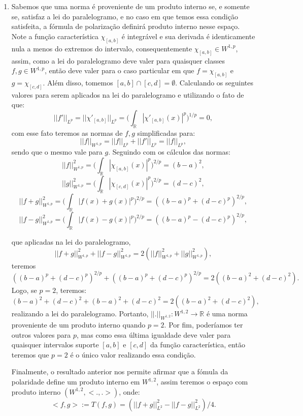 \documentclass{article}
\begin{document}
\begin{enumerate}
\begin{enumerate}
				\item Sabemos que uma norma é proveniente de um produto interno se, e somente se, satisfaz a lei do paralelogramo, e no caso em que temos essa condição satisfeita, a fórmula de polarização definirá produto interno nesse espaço. Note a função característica $\chi_{[a,b]}$ é integrável e sua derivada é identicamente nula a menos do extremos do intervalo, consequentemente $\chi_{[a,b]} \in W^{1,p}$, assim, como a lei do paralelogramo deve valer para quaisquer classes $f, g \in W^{1,p}$, então deve valer para o caso particular em que $f = \chi_{[a,b]}$ e $g = \chi_{[c,d]}$. Além disso, tomemos $[a,b] \cap [c,d] = \emptyset$. Calculando os seguintes valores para serem aplicados na lei do paralelogramo e utilizando o fato de que:
				$$
				||f'||_{ L^{p}}=||\chi'_{[a,b]}||_{L^{p}} = \Big( \int_{\mathbb{R}} |\chi'_{[a,b]}(x)|^{p} \Big)^{1/p} = 0,
				$$
				com esse fato teremos as normas de $f, g$ simplificadas para:
				$$
				||f||_{ W^{1,p}} = ||f||_{L^{p}}+||f'||_{L^{p}} = ||f||_{L^{p}},
				$$
				sendo que o mesmo vale para $g$. Seguindo com os cálculos das normas:
				$$
				||f||_{ W^{1,p}}^{2} = \Big( \int_{\mathbb{R}} |\chi_{[a,b]}(x)|^{p} \Big)^{2/p} = (b-a)^{2},
				$$
				$$  
				||g||_{ W^{1,p}}^{2} = \Big( \int_{\mathbb{R}} |\chi_{[c,d]}(x)|^{p} \Big)^{2/p} = (d-c)^{2},
				$$
				$$
				||f+g||_{ W^{1,p}}^{2} = \Big (\int_{\mathbb{R}}|f(x)+g(x)|^{p} \Big)^{2/p} =((b-a)^{p}+(d-c)^{p})^{2/p},
				$$
				$$
				||f-g||_{ W^{1,p}}^{2} = \Big (\int_{\mathbb{R}}|f(x)-g(x)|^{p} \Big)^{2/p} =((b-a)^{p}-(d-c)^{p})^{2/p},
				$$
				
				que aplicadas na lei do paralelogramo, 
				$$
				||f +g||_{W^{1,p}}^{2}+||f -g||_{W^{1,p}}^{2} =2(||f||_{W^{1,p}}^{2}+||g||_{W^{1,p}}^{2}),
				$$
				teremos
				$$
				((b-a)^{p}+(d-c)^{p})^{2/p}+((b-a)^{p}+(d-c)^{p})^{2/p} = 2((b-a)^{2}+(d-c)^{2}).
				$$
				Logo, se $p=2$, teremos:
				$$
				(b-a)^{2}+(d-c)^{2}+(b-a)^{2}+(d-c)^{2} = 2((b-a)^{2}+(d-c)^{2}),
				$$
				realizando a lei do paralelogramo. Portanto, $||. ||_{W^{1,2}} : W^{1,2} \to \mathbb{R}$ é uma norma proveniente de um produto interno quando $p=2$. Por fim, poderíamos ter outros valores para $p$, mas como essa última igualdade deve valer para quaisquer intervalos suporte $[a, b]$ e $[c,d]$ da função característica, então teremos que $p=2$ é o único valor realizando essa condição.
				
				Finalmente, o resultado anterior nos permite afirmar que a fómula da polaridade define um produto interno em $W^{1,2}$, assim teremos o espaço com produto interno $(W^{1,2}, <.,.>)$, onde:
				$$
				<f,g> := T(f,g) = (||f +g||_{L^{2}}^{2} - ||f -g||_{L^{2}}^{2})/4.
				$$
			\end{enumerate}
		

\end{enumerate}
\end{document}

